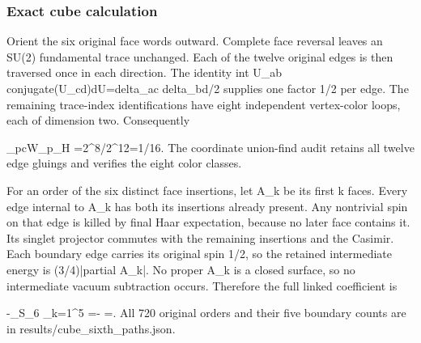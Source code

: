 \documentclass[11pt,a4paper]{article}
\renewcommand{\[}{\begingroup\small\originaldisplaystart}
\renewcommand{\]}{\originaldisplayend\endgroup}
\begin{document}
\subsubsection{Exact cube calculation}\label{exact-cube-calculation}

Orient the six original face words outward. Complete face reversal
leaves an SU(2) fundamental trace unchanged. Each of the twelve original
edges is then traversed once in each direction. The identity
{\ttfamily i\allowbreak{}n\allowbreak{}t\allowbreak{} \allowbreak{}U\allowbreak{}\_\allowbreak{}a\allowbreak{}b\allowbreak{} \allowbreak{}c\allowbreak{}o\allowbreak{}n\allowbreak{}j\allowbreak{}u\allowbreak{}g\allowbreak{}a\allowbreak{}t\allowbreak{}e\allowbreak{}(\allowbreak{}U\allowbreak{}\_\allowbreak{}c\allowbreak{}d\allowbreak{})\allowbreak{}d\allowbreak{}U\allowbreak{}=\allowbreak{}d\allowbreak{}e\allowbreak{}l\allowbreak{}t\allowbreak{}a\allowbreak{}\_\allowbreak{}a\allowbreak{}c\allowbreak{} \allowbreak{}d\allowbreak{}e\allowbreak{}l\allowbreak{}t\allowbreak{}a\allowbreak{}\_\allowbreak{}b\allowbreak{}d\allowbreak{}/\allowbreak{}2\allowbreak{}}
supplies one factor 1/2 per edge. The remaining trace-index
identifications have eight independent vertex-color loops, each of
dimension two. Consequently

\[
 \left\langle\prod_{p\in\partial c}W_p\right\rangle_H
 =2^8/2^{12}=1/16.
\] The coordinate union-find audit retains all twelve edge gluings and
verifies the eight color classes.

For an order of the six distinct face insertions, let A\_k be its first
k faces. Every edge internal to A\_k has both its insertions already
present. Any nontrivial spin on that edge is killed by final Haar
expectation, because no later face contains it. Its singlet projector
commutes with the remaining insertions and the Casimir. Each boundary
edge carries its original spin 1/2, so the retained intermediate energy
is
{\ttfamily (\allowbreak{}3\allowbreak{}/\allowbreak{}4\allowbreak{})\allowbreak{}|\allowbreak{}p\allowbreak{}a\allowbreak{}r\allowbreak{}t\allowbreak{}i\allowbreak{}a\allowbreak{}l\allowbreak{} \allowbreak{}A\allowbreak{}\_\allowbreak{}k\allowbreak{}|\allowbreak{}}.
No proper A\_k is a closed surface, so no intermediate vacuum
subtraction occurs. Therefore the full linked coefficient is

\[
 -\sum_{\pi\in S_6}
   \prod_{k=1}^{5}
 =-
 =.
\] All 720 original orders and their five boundary counts are in
{\ttfamily r\allowbreak{}e\allowbreak{}s\allowbreak{}u\allowbreak{}l\allowbreak{}t\allowbreak{}s\allowbreak{}/\allowbreak{}c\allowbreak{}u\allowbreak{}b\allowbreak{}e\allowbreak{}\_\allowbreak{}s\allowbreak{}i\allowbreak{}x\allowbreak{}t\allowbreak{}h\allowbreak{}\_\allowbreak{}p\allowbreak{}a\allowbreak{}t\allowbreak{}h\allowbreak{}s\allowbreak{}.\allowbreak{}j\allowbreak{}s\allowbreak{}o\allowbreak{}n\allowbreak{}}.
\end{document}
